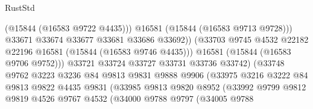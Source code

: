 \begin{lexlean}{RustStd}
\begin{coremodule}
                                            (@15844 (@16583 @9722 @4435)))
                                          @16581
                                          (@15844 (@16583 @9713 @9728)))
                                        @33671
                                        @33674
                                        @33677
                                        @33681
                                        @33686
                                        @33692))
                                    (@33703
                                      @9745
                                      @4532
                                      @22182
                                      @22196
                                      @16581
                                      (@15844 (@16583 @9746 @4435)))
                                    @16581
                                    (@15844 (@16583 @9706 @9752)))
                                  @33721
                                  @33724
                                  @33727
                                  @33731
                                  @33736
                                  @33742)
                                (@33748
                                  @9762
                                  @3223
                                  @3236
                                  @84
                                  @9813
                                  @9831
                                  @9888
                                  @9906
                                  (@33975
                                    @3216
                                    @3222
                                    @84
                                    @9813
                                    @9822
                                    @4435
                                    @9831
                                    (@33985
                                      @9813
                                      @9820
                                      @8952
                                      (@33992
                                        @9799
                                        @9812
                                        @9819
                                        @4526
                                        @9767
                                        @4532
                                        (@34000
                                          @9788
                                          @9797
                                          (@34005
                                            @9788

\end{coremodule}
\end{lexlean}

